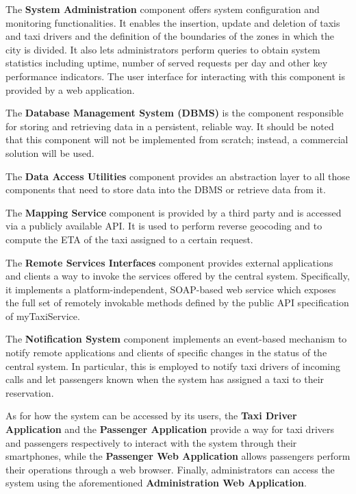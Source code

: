 The \textbf{System Administration} component offers system configuration and monitoring functionalities. It enables the insertion, update and deletion of taxis and taxi drivers and the definition of the boundaries of the zones in which the city is divided. It also lets administrators perform queries to obtain system statistics including uptime, number of served requests per day and other key performance indicators. The user interface for interacting with this component is provided by a web application. 

The \textbf{Database Management System (DBMS)} is the component responsible for storing and retrieving data in a persistent, reliable way. It should be noted that this component will not be implemented from scratch; instead, a commercial solution will be used.

The \textbf{Data Access Utilities} component provides an abstraction layer to all those components that need to store data into the DBMS or retrieve data from it.

The \textbf{Mapping Service} component is provided by a third party and is accessed via a publicly available API. It is used to perform reverse geocoding and to compute the ETA of the taxi assigned to a certain request.

The \textbf{Remote Services Interfaces} component provides external applications and clients a way to invoke the services offered by the central system. Specifically, it implements a platform-independent, SOAP-based web service which exposes the full set of remotely invokable methods defined by the public API specification of myTaxiService.

The \textbf{Notification System} component implements an event-based mechanism to notify remote applications and clients of specific changes in the status of the central system. In particular, this is employed to notify taxi drivers of incoming calls and let passengers known when the system has assigned a taxi to their reservation.

As for how the system can be accessed by its users, the \textbf{Taxi Driver Application} and the \textbf{Passenger Application} provide a way for taxi drivers and passengers respectively to interact with the system through their smartphones, while the \textbf{Passenger Web Application} allows passengers perform their operations through a web browser. Finally, administrators can access the system using the aforementioned \textbf{Administration Web Application}.



